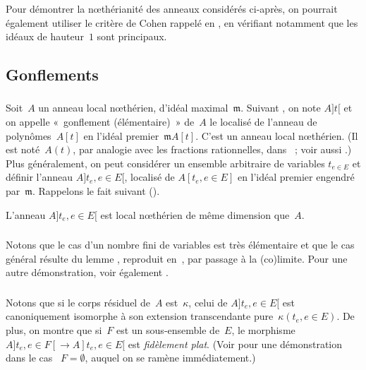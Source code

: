 \documentclass[10pt]{../fichiers-configuration-latex/smfart}
\begin{document}
\begin{remarque2}
Pour démontrer la nœthérianité des anneaux considérés
ci-après, on pourrait également utiliser le critère
de Cohen rappelé en ,
en vérifiant notamment que les idéaux de hauteur $1$
sont principaux.
\end{remarque2}

\subsection{Gonflements}
\label{18B-gonflement}
\subsubsection{}Soit $A$ un anneau local nœthérien, d'idéal maximal $𝔪$.
Suivant , on note $A]t[$
et on appelle « gonflement (élémentaire) »
de $A$ le localisé de l'anneau de polynômes $A[t]$ en l'idéal premier $𝔪A[t]$.
C'est un anneau local nœthérien.
(Il est noté $A(t)$, par analogie avec les
fractions rationnelles, dans \cite[p. 17—18]{Nag62} ;
voir aussi  \cite[p. 138]{KKK@Matsumura}.)
Plus généralement, on peut considérer un ensemble arbitraire
de variables $t_{e ∈ E}$ et définir l'anneau $A]t_e, e ∈ E[$,
localisé de $A[t_e, e ∈ E]$ en l'idéal premier engendré
par $𝔪$. Rappelons le fait suivant ().

\begin{proposition2}
L'anneau $A]t_e, e ∈ E[$ est local nœthérien de même dimension
que $A$.
\end{proposition2}

\subsubsection{}Notons que le cas d'un nombre fini de variables est
très élémentaire et que le cas général
résulte du lemme ,
reproduit en ,
par passage à la (co)limite.
Pour une autre démonstration, voir également
.

\subsubsection{}
Notons que si le corps résiduel de $A$ est $κ$, celui
de $A]t_e, e ∈ E[$ est canoniquement isomorphe à son
extension transcendante pure $κ(t_e, e ∈ E)$.
De plus, on montre que si $F$ est un sous-ensemble de $E$,
le morphisme $A]t_e, e ∈ F[ → A]t_e, e ∈ E[$ est \emph{fidèlement plat}.
(Voir  pour une démonstration
dans le cas  $F=∅$, auquel on se ramène immédiatement.)
\end{document}
